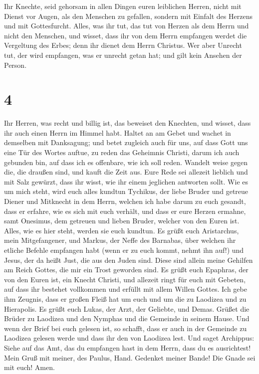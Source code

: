  Ihr Knechte, seid gehorsam in allen Dingen euren
leiblichen Herren, nicht mit Dienst vor Augen, als den Menschen zu
gefallen, sondern mit Einfalt des Herzens und mit Gottesfurcht.
 Alles, was ihr tut, das tut von Herzen als dem Herrn und
nicht den Menschen,  und wisset, dass ihr von dem Herrn
empfangen werdet die Vergeltung des Erbes; denn ihr dienet dem Herrn
Christus.  Wer aber Unrecht tut, der wird empfangen, was
er unrecht getan hat; und gilt kein Ansehen der Person.

\hypertarget{section-3}{%
\section{4}\label{section-3}}

 Ihr Herren, was recht und billig ist, das beweiset den
Knechten, und wisset, dass ihr auch einen Herrn im Himmel habt.
 Haltet an am Gebet und wachet in demselben mit
Danksagung;  und betet zugleich auch für uns, auf dass
Gott uns eine Tür des Wortes auftue, zu reden das Geheimnis Christi,
darum ich auch gebunden bin,  auf dass ich es offenbare,
wie ich soll reden.  Wandelt weise gegen die, die draußen
sind, und kauft die Zeit aus.  Eure Rede sei allezeit
lieblich und mit Salz gewürzt, dass ihr wisst, wie ihr einem jeglichen
antworten sollt.  Wie es um mich steht, wird euch alles
kundtun Tychikus, der liebe Bruder und getreue Diener und Mitknecht in
dem Herrn,  welchen ich habe darum zu euch gesandt, dass
er erfahre, wie es sich mit euch verhält, und dass er eure Herzen
ermahne,  samt Onesimus, dem getreuen und lieben Bruder,
welcher von den Euren ist. Alles, wie es hier steht, werden sie euch
kundtun.  Es grüßt euch Aristarchus, mein Mitgefangener,
und Markus, der Neffe des Barnabas, über welchen ihr etliche Befehle
empfangen habt (wenn er zu euch kommt, nehmt ihn auf!) 
und Jesus, der da heißt Just, die aus den Juden sind. Diese sind allein
meine Gehilfen am Reich Gottes, die mir ein Trost geworden sind.
 Es grüßt euch Epaphras, der von den Euren ist, ein
Knecht Christi, und allezeit ringt für euch mit Gebeten, auf dass ihr
bestehet vollkommen und erfüllt mit allem Willen Gottes. 
Ich gebe ihm Zeugnis, dass er großen Fleiß hat um euch und um die zu
Laodizea und zu Hierapolis.  Es grüßt euch Lukas, der
Arzt, der Geliebte, und Demas.  Grüßet die Brüder zu
Laodizea und den Nymphas und die Gemeinde in seinem Hause.
 Und wenn der Brief bei euch gelesen ist, so schafft,
dass er auch in der Gemeinde zu Laodizea gelesen werde und dass ihr den
von Laodizea lest.  Und saget Archippus: Siehe auf das
Amt, das du empfangen hast in dem Herrn, dass du es ausrichtest!
 Mein Gruß mit meiner, des Paulus, Hand. Gedenket meiner
Bande! Die Gnade sei mit euch! Amen.
